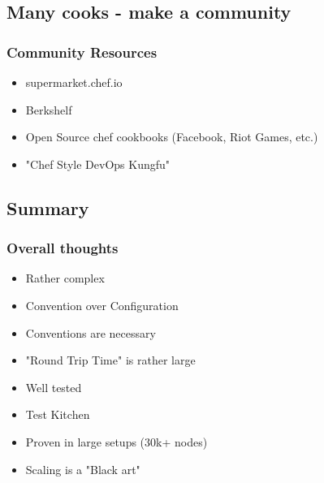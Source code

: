 \subsection{Many cooks - make a community}
\frame
{
  \frametitle{Community Resources}

  \begin{itemize}
    \item supermarket.chef.io
    \item Berkshelf
    \item Open Source chef cookbooks (Facebook, Riot Games, etc.)
    \item "Chef Style DevOps Kungfu"
  \end{itemize}
}

\subsection{Summary}
\frame
{
  \frametitle{Overall thoughts}

  \begin{itemize}
    \item<1-> Rather complex
    \item<2-> Convention over Configuration
    \item<3-> Conventions are necessary
    \item<4-> "Round Trip Time" is rather large
    \item<5-> Well tested
    \item<6-> Test Kitchen
    \item<7-> Proven in large setups (30k+ nodes)
    \item<8-> Scaling is a "Black art"
  \end{itemize}
}

